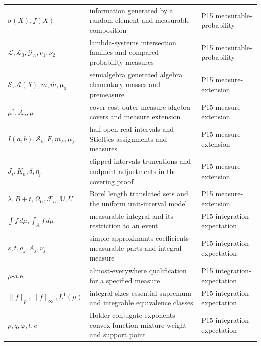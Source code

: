 \begin{longtable}{@{}p{}p{}p{}@{}}
\(\sigma(X),\allowbreak f(X)\) & information generated by a random element and measurable composition & P15 measurable-\allowbreak{}probability \\
\(\mathcal L,\allowbreak \mathcal L_0,\allowbreak \mathcal G_A,\allowbreak \nu_1,\allowbreak \nu_2\) & lambda-systems intersection families and compared probability measures & P15 measurable-\allowbreak{}probability \\
\(\mathcal S,\allowbreak \mathcal A(\mathcal S),\allowbreak m,\allowbreak \overline m,\allowbreak \mu_0\) & semialgebra generated algebra elementary masses and premeasure & P15 measure-\allowbreak{}extension \\
\(\mu^*,\allowbreak A_n,\allowbreak \mu\) & cover-cost outer measure algebra covers and measure extension & P15 measure-\allowbreak{}extension \\
\(I(a,\allowbreak b),\allowbreak \mathcal S_{\mathbb R},\allowbreak F,\allowbreak m_F,\allowbreak \mu_F\) & half-open real intervals and Stieltjes assignments and measures & P15 measure-\allowbreak{}extension \\
\(J_i,\allowbreak K_n,\allowbreak \delta,\allowbreak \eta_i\) & clipped intervals truncations and endpoint adjustments in the covering proof & P15 measure-\allowbreak{}extension \\
\(\lambda,\allowbreak B+t,\allowbreak \Omega_U,\allowbreak \mathcal F_U,\allowbreak \mathbb U,\allowbreak U\) & Borel length translated sets and the uniform unit-interval model & P15 measure-\allowbreak{}extension \\
\(\int f\,d\mu,\allowbreak \int_A f\,d\mu\) & measurable integral and its restriction to an event & P15 integration-\allowbreak{}expectation \\
\(s,\allowbreak t,\allowbreak a_j,\allowbreak A_j,\allowbreak \nu_f\) & simple approximants coefficients measurable parts and integral measure & P15 integration-\allowbreak{}expectation \\
\(\mu\text{-a.e.}\) & almost-everywhere qualification for a specified measure & P15 integration-\allowbreak{}expectation \\
\(\|f\|_p,\allowbreak \|f\|_\infty,\allowbreak L^1(\mu)\) & integral sizes essential supremum and integrable equivalence classes & P15 integration-\allowbreak{}expectation \\
\(p,\allowbreak q,\allowbreak \varphi,\allowbreak t,\allowbreak c\) & Holder conjugate exponents convex function mixture weight and support point & P15 integration-\allowbreak{}expectation \\

\end{longtable}
